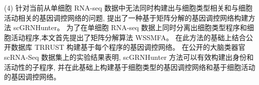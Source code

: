 \begin{abstractcn}
(4) 针对当前从单细胞 RNA-seq 数据中无法同时构建出与细胞类型相关和与细胞活动相关的基因调控网络的问题,
提出了一种基于矩阵分解的基因调控网络构建方法 scGRNHunter。
为了在单细胞 RNA-seq 数据上同时分离出细胞类型程序和细胞活动程序,本文首先提出了矩阵分解算法 WSSMFA。
在此方法的基础上结合公开数据库 TRRUST 构建基于每个程序的基因调控网络。
在公开的大脑类器官 scRNA-Seq 数据集上的实验结果表明,
scGRNHunter 方法可以有效构建出身份和活动性的子程序, 
并在此基础上构建基于细胞类型的基因调控网络和基于细胞活动的基因调控网络。





\end{abstractcn}